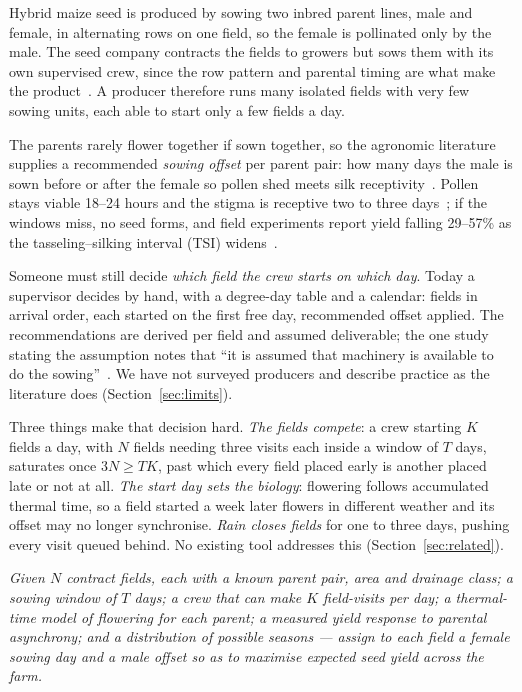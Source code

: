 \documentclass[10pt,twocolumn]{article}
\begin{document}
Hybrid maize seed is produced by sowing two inbred parent lines, male and
female, in alternating rows on one field, so the female is pollinated only
by the male. The seed company contracts the fields to growers but sows them
with its own supervised crew, since the row pattern and parental timing are
what make the product~\cite{chassaigne2021,chassaigne2020}. A producer
therefore runs many isolated fields with very few sowing units, each able to
start only a few fields a day.

The parents rarely flower together if sown together, so the agronomic
literature supplies a recommended \emph{sowing offset} per parent pair: how
many days the male is sown before or after the female so pollen shed meets
silk receptivity~\cite{marahatta2025,chassaigne2021,asefa2024}.
Pollen stays viable 18--24 hours and the stigma is receptive two to three
days~\cite{marahatta2025}; if the windows miss, no seed forms, and field
experiments report yield falling 29--57\% as the tasseling--silking interval
(TSI) widens~\cite{marahatta2025}.

Someone must still decide \emph{which field the crew starts on which day}.
Today a supervisor decides by hand, with a degree-day table and a calendar:
fields in arrival order, each started on the first free day, recommended
offset applied. The recommendations are derived per field and assumed
deliverable; the one study stating the assumption notes that ``it is assumed
that machinery is available to do the sowing''~\cite{chassaigne2021}. We
have not surveyed producers and describe practice as the literature does
(Section~\ref{sec:limits}).

Three things make that decision hard. \emph{The fields compete}: a crew
starting $K$ fields a day, with $N$ fields needing three visits each inside
a window of $T$ days, saturates once $3N \ge TK$, past which every field
placed early is another placed late or not at all. \emph{The start day sets
the biology}: flowering follows accumulated thermal time, so a field started
a week later flowers in different weather and its offset may no longer
synchronise. \emph{Rain closes fields} for one to three days, pushing every
visit queued behind. No existing tool addresses this
(Section~\ref{sec:related}).

\emph{Given $N$ contract fields, each with a known parent pair, area and
drainage class; a sowing window of $T$ days; a crew that can make $K$
field-visits per day; a thermal-time model of flowering for each parent; a
measured yield response to parental asynchrony; and a distribution of
possible seasons --- assign to each field a female sowing day and a male
offset so as to maximise expected seed yield across the farm.}
\end{document}
